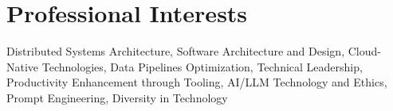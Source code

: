 
\section{Professional Interests}
\footnotesize{Distributed Systems Architecture, Software Architecture and Design, Cloud-Native Technologies, Data
    Pipelines Optimization, Technical Leadership, Productivity Enhancement through Tooling, AI/LLM Technology and Ethics, Prompt Engineering, Diversity in Technology}